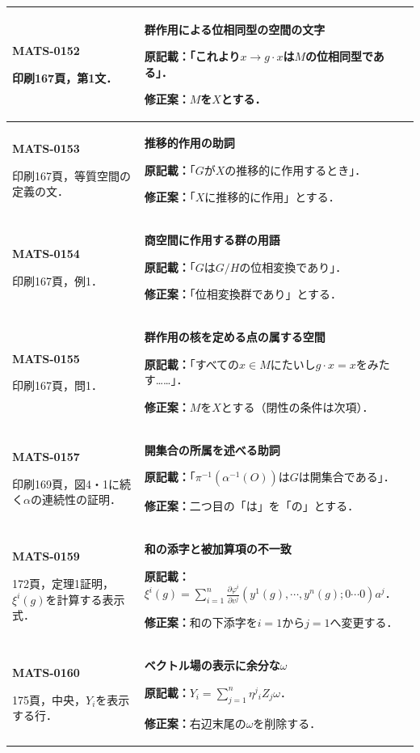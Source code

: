 \documentclass[a4paper,10pt]{ltjsarticle}
\begin{document}
\begin{longtable}{@{}>{\raggedright\arraybackslash}p{.19\linewidth}>{\raggedright\arraybackslash}p{.77\linewidth}@{}}
\hline
\hypertarget{MATS-0152}{}\textbf{MATS-0152}\par 印刷167頁，第1文． & \textbf{群作用による位相同型の空間の文字}\par\textbf{原記載：}「これより$x\to g\cdot x$は$M$の位相同型である」．\par\textbf{修正案：}$M$を$X$とする． \\[3pt]
\hline
\hypertarget{MATS-0153}{}\textbf{MATS-0153}\par 印刷167頁，等質空間の定義の文． & \textbf{推移的作用の助詞}\par\textbf{原記載：}「$G$が$X$の推移的に作用するとき」．\par\textbf{修正案：}「$X$に推移的に作用」とする． \\[3pt]
\hline
\hypertarget{MATS-0154}{}\textbf{MATS-0154}\par 印刷167頁，例1． & \textbf{商空間に作用する群の用語}\par\textbf{原記載：}「$G$は$G/H$の位相変換であり」．\par\textbf{修正案：}「位相変換群であり」とする． \\[3pt]
\hline
\hypertarget{MATS-0155}{}\textbf{MATS-0155}\par 印刷167頁，問1． & \textbf{群作用の核を定める点の属する空間}\par\textbf{原記載：}「すべての$x\in M$にたいし$g\cdot x=x$をみたす……」．\par\textbf{修正案：}$M$を$X$とする（閉性の条件は次項）． \\[3pt]
\hline
\hypertarget{MATS-0157}{}\textbf{MATS-0157}\par 印刷169頁，図4・1に続く$\alpha$の連続性の証明． & \textbf{開集合の所属を述べる助詞}\par\textbf{原記載：}「$\pi^{-1}(\alpha^{-1}(O))$は$G$は開集合である」．\par\textbf{修正案：}二つ目の「は」を「の」とする． \\[3pt]
\hline
\hypertarget{MATS-0159}{}\textbf{MATS-0159}\par 172頁，定理1証明，$\xi^i(g)$を計算する表示式． & \textbf{和の添字と被加算項の不一致}\par\textbf{原記載：}$\displaystyle\xi^i(g)=\sum_{i=1}^n\frac{\partial\varphi^i}{\partial v^j}(y^1(g),\cdots,y^n(g);0\cdots0)a^j$．\par\textbf{修正案：}和の下添字を$i=1$から$j=1$へ変更する． \\[3pt]
\hline
\hypertarget{MATS-0160}{}\textbf{MATS-0160}\par 175頁，中央，$Y_i$を表示する行． & \textbf{ベクトル場の表示に余分な$\omega$}\par\textbf{原記載：}$\displaystyle Y_i=\sum_{j=1}^n\eta^j{}_iZ_j\omega$．\par\textbf{修正案：}右辺末尾の$\omega$を削除する． \\[3pt]

\end{longtable}
\end{document}
